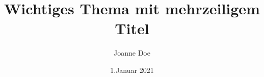 \def\thetitle{Wichtiges Thema mit mehrzeiligem Titel}
\def\theauthor{Joanne Doe}
\def\thedate{1.\@ Januar 2021}


\title{\thetitle}
\author{\theauthor}
\date{\thedate}
